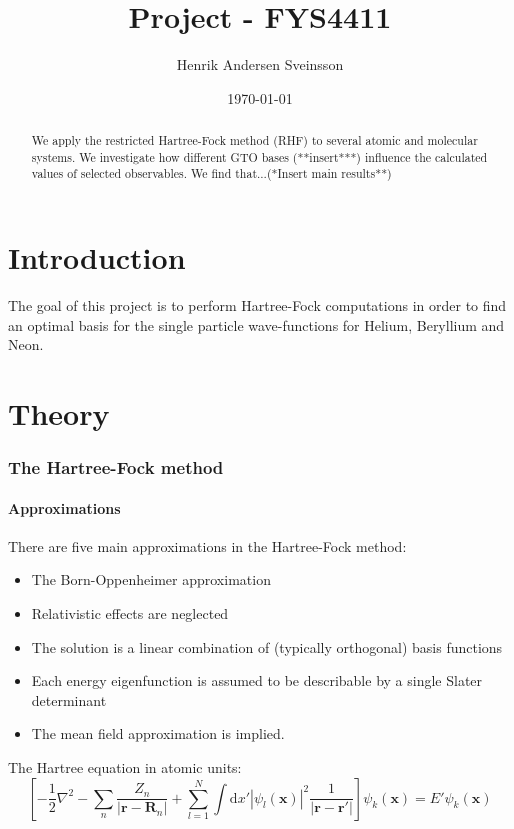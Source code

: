 \documentclass[a4paper,10pt, twocolumn, pre]{revtex4}
\newcommand{\rvec}{\mathbf{r}}
\newcommand{\Rvec}{\mathbf{R}}
\newcommand{\xvec}{\mathbf{x}}
\newcommand{\dd}{\mathrm{d}}
\begin{document}
\title{Project - FYS4411}
\author{Henrik Andersen Sveinsson}
\date{\today}

\begin{abstract}
We apply the restricted Hartree-Fock method (RHF) to several atomic and molecular systems. We investigate how different GTO bases (**insert***) influence the calculated values of selected observables. We find that...(*Insert main results**)
\end{abstract}
\maketitle


\part{Introduction}
The goal of this project is to perform Hartree-Fock computations in order to find an optimal basis for the single particle wave-functions for Helium, Beryllium and Neon.

\part{Theory}
\section{The Hartree-Fock method}

\subsection{Approximations}
There are five main approximations in the Hartree-Fock method:
\begin{itemize}
 \item The Born-Oppenheimer approximation
 \item Relativistic effects are neglected
 \item The solution is a linear combination of (typically orthogonal) basis functions
 \item Each energy eigenfunction is assumed to be describable by a single Slater determinant
 \item The mean field approximation is implied. 
\end{itemize}

The Hartree equation in atomic units:
\begin{equation}
 \left[ -\frac{1}{2}\nabla^2 -\sum_n \frac{Z_n}{|\rvec -\Rvec_n|} + 
 \sum_{l=1}^N \int \dd x' |\psi_l(\xvec)|^2 \frac{1}{|\rvec -\rvec'|}\right] \psi_k(\xvec) 
 = E' \psi_k (\xvec)
\end{equation}
\end{document}
